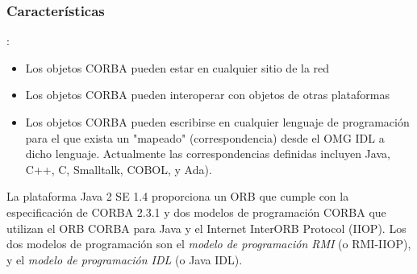 \documentclass[
	12pt, %
	fleqn, %
	a4paper, %
	oneside, %
]{LegrandOrangeBook}
\begin{document}
\subsubsection*{Características}:
\begin{itemize}
\item Los objetos CORBA pueden estar en cualquier sitio de la red
\item Los objetos CORBA pueden interoperar con objetos de otras plataformas
\item Los objetos CORBA pueden escribirse en cualquier lenguaje de programación para el que exista un "mapeado" (correspondencia) desde el OMG IDL a dicho lenguaje. Actualmente las correspondencias definidas incluyen Java, C++, C, Smalltalk, COBOL, y Ada).
\end{itemize}
La plataforma Java 2 SE 1.4 proporciona un ORB que cumple con la especificación de CORBA 2.3.1 y dos modelos de programación CORBA que utilizan el ORB CORBA para Java y el Internet InterORB Protocol (IIOP). Los dos modelos de programación son el \textit{modelo de programación RMI} (o RMI-IIOP), y el \textit{modelo de programación IDL} (o Java IDL).
\end{document}
